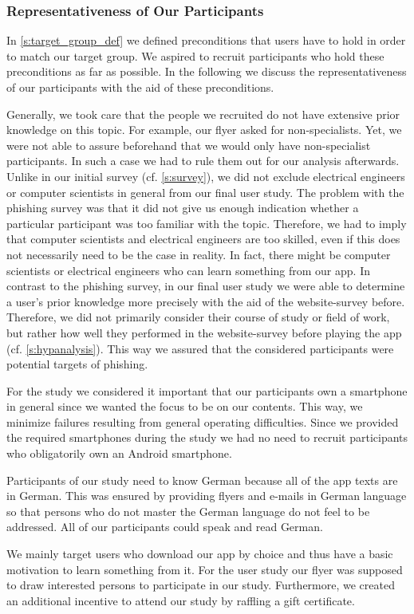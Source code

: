 \subsubsection{Representativeness of Our Participants}
\label{s:representativeness}
In \autoref{s:target_group_def} we defined preconditions that users have to hold in order to match our target group.
We aspired to recruit participants who hold these preconditions as far as possible.
In the following we discuss the representativeness of our participants with the aid of these preconditions.

\begin{description}[leftmargin=0cm]
	\item[Attackability:] Generally, we took care that the people we recruited do not have extensive prior knowledge on this topic.
For example, our flyer asked for non-specialists.
Yet, we were not able to assure beforehand that we would only have non-specialist participants.
In such a case we had to rule them out for our analysis afterwards.
Unlike in our initial survey (cf. \autoref{s:survey}), we did not exclude electrical engineers or computer scientists in general from our final user study.
The problem with the phishing survey was that it did not give us enough indication whether a particular participant was too familiar with the topic.
Therefore, we had to imply that computer scientists and electrical engineers are too skilled, even if this does not necessarily need to be the case in reality.
In fact, there might be computer scientists or electrical engineers who can learn something from our app.
In contrast to the phishing survey, in our final user study we were able to determine a user's prior knowledge more precisely with the aid of the website-survey before.
Therefore, we did not primarily consider their course of study or field of work, but rather how well they performed in the website-survey before playing the app (cf. \autoref{s:hypanalysis}).
This way we assured that the considered participants were potential targets of phishing.
	\item[Android Users:] For the study we considered it important that our participants own a smartphone in general since we wanted the focus to be on our contents. This way, we minimize failures resulting from general operating difficulties.
Since we provided the required smartphones during the study we had no need to recruit participants who obligatorily own an Android smartphone.
	\item[Language:] Participants of our study need to know German because all of the app texts are in German. This was ensured by providing flyers and e-mails in German language so that persons who do not master the German language do not feel to be addressed.
All of our participants could speak and read German.
\item[Motivation:] We mainly target users who download our app by choice and thus have a basic motivation to learn something from it.
For the user study our flyer was supposed to draw interested persons to participate in our study.
Furthermore, we created an additional incentive to attend our study by raffling a gift certificate.
\end{description}
